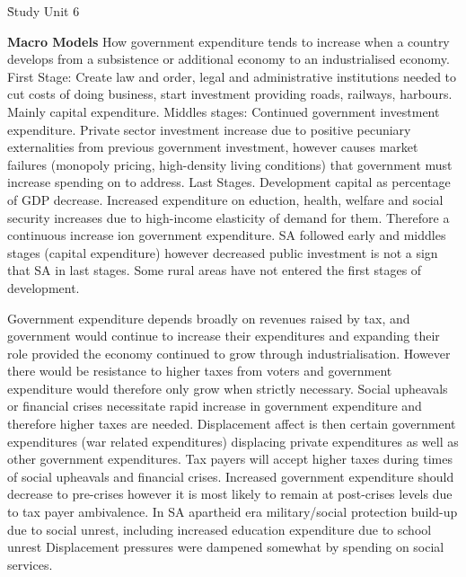 \documentclass[12pt]{examnotes}
\begin{document}
\h{Study Unit 6}

{\Large\bf Macro Models}
\ra How government expenditure tends to increase when a country develops from a subsistence or additional economy to an industrialised economy. 
\ra First Stage: Create law and order, legal and administrative institutions needed to cut costs of doing business, start investment providing roads, railways, harbours. Mainly capital expenditure.
\ra Middles stages: Continued government investment expenditure. Private sector investment increase due to positive pecuniary externalities from previous government investment, however causes market failures (monopoly pricing, high-density living conditions) that government must increase spending on to address.
\ra Last Stages. Development capital as percentage of GDP decrease. Increased expenditure on eduction, health, welfare and social security increases due to high-income elasticity of demand for them. Therefore a continuous increase ion government expenditure. 
\ra SA followed early and middles stages (capital expenditure) however decreased public investment is not a sign that SA in last stages.
\ra Some rural areas have not entered the first stages of development.

\ra Government expenditure depends broadly on revenues raised by tax, and government would continue to increase their expenditures and expanding their role provided the economy continued to grow through industrialisation. However there would be resistance to higher taxes from voters and government expenditure would therefore only grow when strictly necessary.
\ra Social upheavals or financial crises necessitate rapid increase in government expenditure and therefore higher taxes are needed.
\ra Displacement affect is then certain government expenditures (war related expenditures) displacing private expenditures as well as other government expenditures. 
\ra Tax payers will accept higher taxes during times of social upheavals and financial crises. 
\ra Increased government expenditure should decrease to pre-crises however it is most likely to remain at post-crises levels due to tax payer ambivalence.
\ra In SA apartheid era military/social protection build-up due to social unrest, including increased education expenditure due to school unrest
\ra Displacement pressures were dampened somewhat by spending on social services. 
\end{document}
